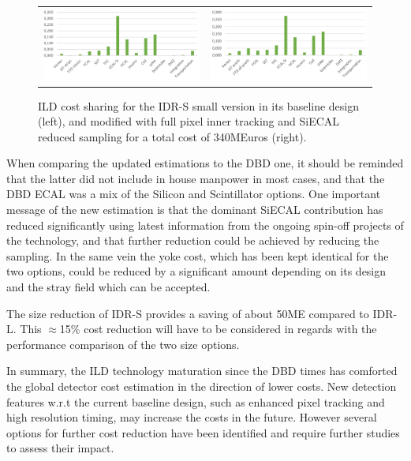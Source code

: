 \begin{figure}[h!]
\begin{tabular}{cc}
\includegraphics[width=0.5\hsize]{Costing/Small_cost_sharing.PNG}&
\includegraphics[width=0.5\hsize]{Costing/Small26_cost_sharing.PNG}
\caption{ILD cost sharing for the IDR-S small version in its baseline design (left), and modified with full pixel inner tracking and SiECAL reduced sampling for a total cost of 340MEuros (right). }
\label{Costing:Small_cost_sharing}
\end{tabular}
\end{figure}


When comparing the updated estimations to the DBD one, it should be reminded that the latter did not include in house manpower in most cases, and that the DBD ECAL was a mix of the Silicon and Scintillator options. 
One important message of the new estimation is that the dominant SiECAL contribution has reduced significantly using latest information from the ongoing spin-off projects of the technology, and that further reduction could be achieved by reducing the sampling. In the same vein the yoke cost, which has been kept identical for the two options, could be reduced by a significant amount depending on its design and the stray field which can be accepted. 

The size reduction of IDR-S provides a saving of about 50ME compared to IDR-L. This $\approx$15\% cost reduction will have to be considered in regards with the performance comparison of the two size options.

In summary, the ILD technology maturation since the DBD times has comforted the global detector cost estimation in the direction of lower costs. New detection features w.r.t the current baseline design, such as enhanced pixel tracking and high resolution timing, may increase the costs in the future. However several options for further cost reduction have been identified and require further studies to assess their impact. 

